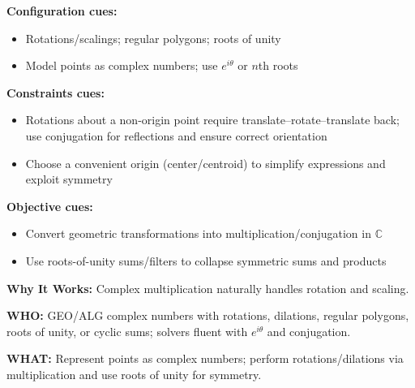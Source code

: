 \documentclass[12pt]{article}
\begin{document}
\textbf{Configuration cues:}
\begin{itemize}
    \item Rotations/scalings; regular polygons; roots of unity
    \item Model points as complex numbers; use $e^{i\theta}$ or $n$th roots
\end{itemize}

\textbf{Constraints cues:}
\begin{itemize}
    \item Rotations about a non-origin point require translate--rotate--translate back; use conjugation for reflections and ensure correct orientation
    \item Choose a convenient origin (center/centroid) to simplify expressions and exploit symmetry
\end{itemize}

\textbf{Objective cues:}
\begin{itemize}
    \item Convert geometric transformations into multiplication/conjugation in $\mathbb{C}$
    \item Use roots-of-unity sums/filters to collapse symmetric sums and products
\end{itemize}

\textbf{Why It Works:} Complex multiplication naturally handles rotation and scaling.

\textbf{WHO:} GEO/ALG complex numbers with rotations, dilations, regular polygons, roots of unity, or cyclic sums; solvers fluent with $e^{i\theta}$ and conjugation.

\textbf{WHAT:} Represent points as complex numbers; perform rotations/dilations via multiplication and use roots of unity for symmetry.
\end{document}
